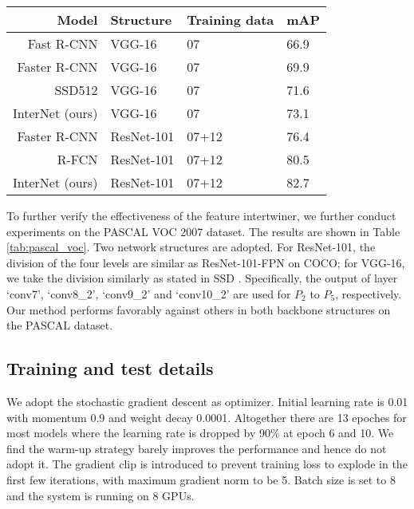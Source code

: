 \documentclass{article} \usepackage{iclr2019_conference,times}
\begin{document}
\begin{table*}[h]
	\centering
	\begin{tabular}{   r |  l l l}
		Model & Structure & Training data & mAP \\ \toprule
		Fast R-CNN \citep{ross15_fast_rcnn} & VGG-16 & 07 & 66.9 \\
		Faster R-CNN \citep{he2016_resnet} & VGG-16 & 07 & 69.9 \\
		SSD512 \citep{liu2015_ssd} & VGG-16 & 07 & 71.6 \\
		InterNet (ours) & VGG-16 & 07 & 73.1 \\ 
		\midrule
		Faster R-CNN \citep{he2016_resnet} & ResNet-101 & 07+12 & 76.4 \\
		R-FCN \citep{dai2016_rfcn} & ResNet-101 & 07+12 & 80.5 \\
		InterNet (ours) & ResNet-101 & 07+12 & 82.7 \\
	\end{tabular}
	\vspace{-.2cm}
	\caption{
{Comparison of our model with feature intertwiner to other methods on PASCAL VOC 2007 test set. Here we adopt two backbone options: ResNet-101 and VGG-16 without FPN to fairly compare with others. The number of levels is 4, the same as on COCO benchmark.}
	}\label{tab:pascal_voc}
\end{table*}

{To 
further verify the effectiveness of the feature intertwiner, we further 
conduct experiments on the PASCAL VOC 2007 dataset. The results are shown in Table \ref{tab:pascal_voc}.
Two network structures are adopted. For ResNet-101, the division of the four levels are similar as ResNet-101-FPN on COCO; for VGG-16, we take the division similarly as stated in SSD \citep{liu2015_ssd}. Specifically, the output of layer `conv7', `conv8\_2', `conv9\_2' and `conv10\_2' are used for $P_2$ to $P_5$, respectively.
Our method performs favorably against others in both backbone structures on the PASCAL dataset.}

\subsection{Training and test details}\label{sec:training_test_details}
We adopt the stochastic gradient descent as optimizer. Initial learning rate is 0.01 with momentum 0.9 and weight decay 0.0001. Altogether there are 13 epoches for most models where the learning rate is dropped by 90\% at epoch 6 and 10. We find the warm-up strategy \citep{goyal2017_fast_imagenet_train} barely improves the performance and hence do not adopt it. The gradient clip is introduced to prevent training loss to explode in the first few iterations, with maximum gradient norm to be 5. Batch size is set to 8 and the system is running on 8 GPUs.
\end{document}
